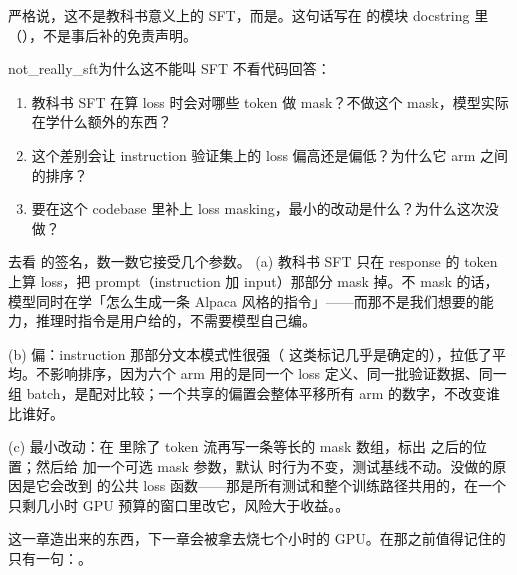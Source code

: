 严格说，这不是教科书意义上的 SFT，而是。这句话写在  的模块 docstring 里（），不是事后补的免责声明。

\begin{checkpoint}{not_really_sft}{为什么这不能叫 SFT}
不看代码回答：
\begin{enumerate}[label=(\alph*)]
  \item 教科书 SFT 在算 loss 时会对哪些 token 做 mask？不做这个 mask，模型实际在学什么额外的东西？
  \item 这个差别会让 instruction 验证集上的 loss 偏高还是偏低？为什么它 arm 之间的排序？
  \item 要在这个 codebase 里补上 loss masking，最小的改动是什么？为什么这次没做？
\end{enumerate}
\hint 去看  的签名，数一数它接受几个参数。
\ifshowanswers
\tcblower
\answer (a) 教科书 SFT 只在 response 的 token 上算 loss，把 prompt（instruction 加 input）那部分 mask 掉。不 mask 的话，模型同时在学「怎么生成一条 Alpaca 风格的指令」——而那不是我们想要的能力，推理时指令是用户给的，不需要模型自己编。

(b) 偏：instruction 那部分文本模式性很强（ 这类标记几乎是确定的），拉低了平均。不影响排序，因为六个 arm 用的是同一个 loss 定义、同一批验证数据、同一组 batch，是配对比较；一个共享的偏置会整体平移所有 arm 的数字，不改变谁比谁好。

(c) 最小改动：在  里除了 token 流再写一条等长的 mask 数组，标出  之后的位置；然后给  加一个可选 mask 参数，默认  时行为不变，测试基线不动。没做的原因是它会改到  的公共 loss 函数——那是所有测试和整个训练路径共用的，在一个只剩几小时 GPU 预算的窗口里改它，风险大于收益。。
\whereincode {}
\fi
\end{checkpoint}

\medskip
\noindent 这一章造出来的东西，下一章会被拿去烧七个小时的 GPU。在那之前值得记住的只有一句：。
